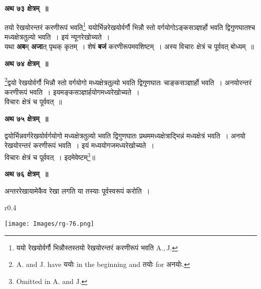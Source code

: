 \documentclass[11pt, openany]{book}
\begin{document}
\begin{center}
\textbf{\large अथ ७३ क्षेत्रम्~॥}
\end{center}

{\ab तयो रेखयोरन्तरं करणीरूपं भवति\renewcommand{\thefootnote}{३}\footnote{ययो रेखयोर्वर्गौ भिन्नौस्तस्तयो रेखयोरन्तरं करणीरूपं भवति {\en A.,\,J.}} ययोर्भिन्नरेखयोर्वर्गौ भिन्नौ स्तो वर्गयोगोऽङ्कसञ्ज्ञार्हो भवति द्विगुणघातश्च मध्यक्षेत्रतुल्यो भवति~। इयं न्यूनरेखोच्यते~। }\\

 यथा \textbf{अब}म् \textbf{अजा}त् पृथक् कृतम्~। शेषं \textbf{बजं} करणीरूपमवशिष्टम्~। अस्य विचारः क्षेत्रं च पूर्ववत् बोध्यम्~॥ 
\vspace{2mm}

\begin{center}
\textbf{\large अथ ७४ क्षेत्रम्~॥}
\end{center}

{\ab \renewcommand{\thefootnote}{४}\footnote{{\en A. and J. have} ययोः {\en in the beginning and} तयोः {\en for} अनयोः.}द्वयो रेखयोर्वर्गौ भिन्नौ स्तो वर्गयोगो मध्यक्षेत्रतुल्यो भवति द्विगुणघातः चाङ्कसञ्ज्ञार्हो भवति~। अनयोरन्तरं करणीरूपं भवति~। इयमङ्कसञ्ज्ञार्हयोगमध्यरेखोच्यते~। }\\

विचारः क्षेत्रं च पूर्ववत्~॥ 

\newpage
\begin{center}
\textbf{\large अथ ७५ क्षेत्रम्~॥}
\end{center}

{\ab द्वयोर्भिन्नवर्गरेखयोर्वर्गयोगो मध्यक्षेत्रतुल्यो भवति द्विगुणघातः प्रथममध्यक्षेत्राद्भिन्नं मध्यक्षेत्रं भवति~। अनयो रेखयोरन्तरं करणीरूपं भवति~। इयं मध्ययोगजमध्यरेखोच्यते~। }\\

विचारः क्षेत्रं च पूर्ववत्~। इदमेवेष्टम्\renewcommand{\thefootnote}{१}\footnote{{\en Omitted in A. and J.}}\;॥ 
\vspace{2mm}

\begin{center}
\textbf{\large अथ ७६ क्षेत्रम्~॥}
\end{center}

 {\ab अन्तररेखायामेकैव रेखा लगति या तस्याः पूर्वस्वरूपं करोति~। }\\

\begin{wrapfigure}{r}{0.4\textwidth}
\vspace{-8mm}
\begin{flushright}
\texttt{[image: Images/rg-76.png]}
\end{flushright}
\vspace{-8mm}
\end{wrapfigure}
\end{document}

